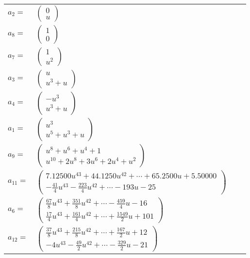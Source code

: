 \documentclass[1p]{elsarticle_modified}
\theoremstyle{definition}
\begin{document}
\begin{tabular}{m{7pt} m{180pt} m{7pt} m{180pt} }
\flushright $a_{2}=$&$\begin{pmatrix}0\\u\end{pmatrix}$ \\
\flushright $a_{8}=$&$\begin{pmatrix}1\\0\end{pmatrix}$ \\
\flushright $a_{7}=$&$\begin{pmatrix}1\\u^2\end{pmatrix}$ \\
\flushright $a_{3}=$&$\begin{pmatrix}u\\u^3+u\end{pmatrix}$ \\
\flushright $a_{4}=$&$\begin{pmatrix}- u^3\\u^3+u\end{pmatrix}$ \\
\flushright $a_{1}=$&$\begin{pmatrix}u^3\\u^5+u^3+u\end{pmatrix}$ \\
\flushright $a_{9}=$&$\begin{pmatrix}u^8+u^6+u^4+1\\u^{10}+2 u^8+3 u^6+2 u^4+u^2\end{pmatrix}$ \\
\flushright $a_{11}=$&$\begin{pmatrix}7.12500 u^{43}+44.1250 u^{42}+\cdots+65.2500 u+5.50000\\-\frac{41}{4} u^{43}-\frac{223}{4} u^{42}+\cdots-193 u-25\end{pmatrix}$ \\
\flushright $a_{6}=$&$\begin{pmatrix}\frac{67}{8} u^{43}+\frac{351}{8} u^{42}+\cdots-\frac{459}{4} u-16\\\frac{17}{4} u^{43}+\frac{161}{4} u^{42}+\cdots+\frac{1549}{2} u+101\end{pmatrix}$ \\
\flushright $a_{12}=$&$\begin{pmatrix}\frac{37}{8} u^{43}+\frac{215}{8} u^{42}+\cdots+\frac{167}{2} u+12\\-4 u^{43}-\frac{49}{2} u^{42}+\cdots-\frac{329}{2} u-21\end{pmatrix}$ \\

\end{tabular}
\end{document}
